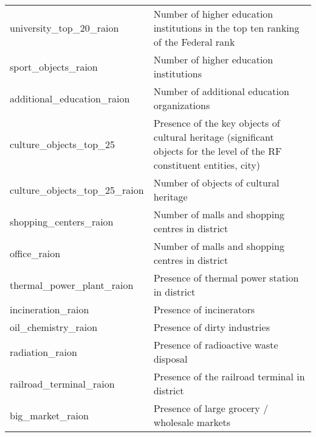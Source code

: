 \begin{longtable}[c]{ll}
    university\_top\_20\_raion                 & Number of higher education institutions in the top ten ranking of the Federal rank                                        \\
    sport\_objects\_raion                      & Number of higher education institutions                                                                                   \\
    additional\_education\_raion               & Number of additional education organizations                                                                              \\
    culture\_objects\_top\_25                  & Presence of the key objects of cultural heritage (significant objects for the level of the RF constituent entities, city) \\
    culture\_objects\_top\_25\_raion           & Number of  objects of cultural heritage                                                                                   \\
    shopping\_centers\_raion                   & Number of malls and shopping centres in district                                                                          \\
    office\_raion                              & Number of malls and shopping centres in district                                                                          \\
    thermal\_power\_plant\_raion               & Presence of thermal power station in district                                                                             \\
    incineration\_raion                        & Presence of incinerators                                                                                                  \\
    oil\_chemistry\_raion                      & Presence of dirty industries                                                                                              \\
    radiation\_raion                           & Presence of radioactive waste disposal                                                                                    \\
    railroad\_terminal\_raion                  & Presence of the railroad terminal in district                                                                             \\
    big\_market\_raion                         & Presence of large grocery / wholesale markets                                                                             \\

\end{longtable}
